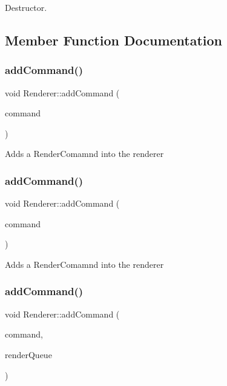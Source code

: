 Destructor. 

\subsection{Member Function Documentation}
\mbox{\label{classRenderer_a139f9b3af45019ab6ec84743d83eff0c}} 
\subsubsection{\texorpdfstring{add\+Command()}{addCommand()}\hspace{0.1cm}{\footnotesize\ttfamily [1/4]}}
{\footnotesize\ttfamily void Renderer\+::add\+Command (\begin{DoxyParamCaption}\item[{\hyperlink{classRenderCommand}{Render\+Command} $\ast$}]{command }\end{DoxyParamCaption})}

Adds a {\ttfamily Render\+Comamnd} into the renderer \mbox{\label{classRenderer_a139f9b3af45019ab6ec84743d83eff0c}} 
\subsubsection{\texorpdfstring{add\+Command()}{addCommand()}\hspace{0.1cm}{\footnotesize\ttfamily [2/4]}}
{\footnotesize\ttfamily void Renderer\+::add\+Command (\begin{DoxyParamCaption}\item[{\hyperlink{classRenderCommand}{Render\+Command} $\ast$}]{command }\end{DoxyParamCaption})}

Adds a {\ttfamily Render\+Comamnd} into the renderer \mbox{\label{classRenderer_a4f73aa27436dc3844a5bc1181cad5521}} 
\subsubsection{\texorpdfstring{add\+Command()}{addCommand()}\hspace{0.1cm}{\footnotesize\ttfamily [3/4]}}
{\footnotesize\ttfamily void Renderer\+::add\+Command (\begin{DoxyParamCaption}\item[{\hyperlink{classRenderCommand}{Render\+Command} $\ast$}]{command,  }\item[{int}]{render\+Queue }\end{DoxyParamCaption})}

